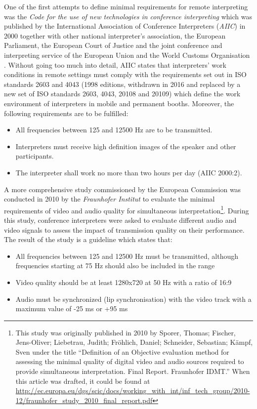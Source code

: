 \documentclass[output=paper]{langsci/langscibook}
\begin{document}
One of the first attempts to define minimal requirements for remote interpreting was the \textit{Code for the use of new technologies in conference interpreting} which was published by the International Association of Conference Interpreters (\textit{AIIC}) in 2000 together with other national interpreter’s association, the European Parliament, the European Court of Justice and the joint conference and interpreting service of the European Union and the World Customs Organisation \citep[31]{Korak2010}. Without going too much into detail, AIIC states that interpreters’ work conditions in remote settings must comply with the requirements set out in ISO standards 2603 and 4043 (1998 editions, withdrawn in 2016 and replaced by a new set of ISO standards 2603, 4043, 20108 and 20109) which define the work environment of interpreters in mobile and permanent booths. Moreover, the following requirements are to be fulfilled:

\begin{itemize}
\item All frequencies between 125 and 12500 Hz are to be transmitted.
\item Interpreters must receive high definition images of the speaker and other participants. 
\item The interpreter shall work no more than two hours per day (AIIC 2000:2).
\end{itemize}

A more comprehensive study commissioned by the European Commission was conducted in 2010 by the \textit{Fraunhofer Institut} to evaluate the minimal requirements of video and audio quality for simultaneous interpretation\footnote{This study was originally published in 2010 by Sporer, Thomas; Fischer, Jens-Oliver; Liebetrau, Judith; Fröhlich, Daniel; Schneider, Sebastian; Kämpf, Sven under the title “Definition of an Objective evaluation method for assessing the minimal quality of digital video and audio sources required to provide simultaneous interpretation. Final Report. Fraunhofer IDMT.” When this article was drafted, it could be found at \url{http://ec.europa.eu/dgs/scic/docs/working_with_int/inf_tech_group/2010-12/fraunhofer_study_2010_final_report.pdf}}. During this study, conference interpreters were asked to evaluate different audio and video signals to assess the impact of transmission quality on their performance. The result of the study is a guideline which states that:

\begin{itemize}
\item All frequencies between 125 and 12500 Hz must be transmitted, although frequencies starting at 75 Hz should also be included in the range
\item Video quality should be at least 1280x720 at 50 Hz with a ratio of 16:9
\item Audio must be synchronized (lip synchronisation) with the video track with a maximum value of -25 ms or +95 ms
\end{itemize}
\end{document}
